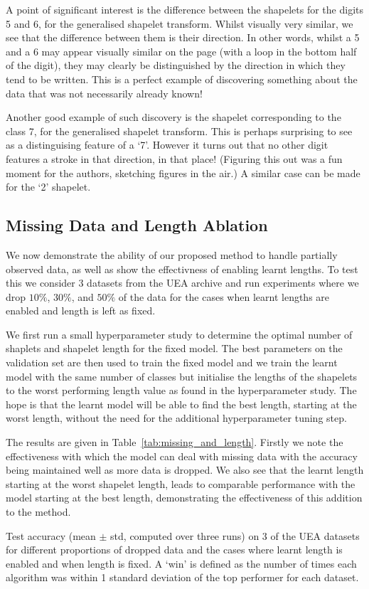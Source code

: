 \documentclass{article}
\theoremstyle{plain}
\theoremstyle{definition}
\begin{document}
A point of significant interest is the difference between the shapelets for the digits 5 and 6, for the generalised shapelet transform. Whilst visually very similar, we see that the difference between them is their direction. In other words, whilst a 5 and a 6 may appear visually similar on the page (with a loop in the bottom half of the digit), they may clearly be distinguished by the direction in which they tend to be written. This is a perfect example of discovering something about the data that was not necessarily already known!

Another good example of such discovery is the shapelet corresponding to the class 7, for the generalised shapelet transform. This is perhaps surprising to see as a distinguising feature of a `7'. However it turns out that no other digit features a stroke in that direction, in that place! (Figuring this out was a fun moment for the authors, sketching figures in the air.) A similar case can be made for the `2' shapelet.

\subsection{Missing Data and Length Ablation} \label{subsec:uea_missing_and_length}
	We now demonstrate the ability of our proposed method to handle partially observed data, as well as show the effectivness of enabling learnt lengths. To test this we consider 3 datasets from the UEA archive and run experiments where we drop $10\%$, $30\%$, and $50\%$ of the data for the cases when learnt lengths are enabled and length is left as fixed.

	We first run a small hyperparameter study to determine the optimal number of shaplets and shapelet length for the fixed model. The best parameters on the validation set are then used to train the fixed model and we train the learnt model with the same number of classes but initialise the lengths of the shapelets to the worst performing length value as found in the hyperparameter study. The hope is that the learnt model will be able to find the best length, starting at the worst length, without the need for the additional hyperparameter tuning step.

	 The results are given in Table~\ref{tab:missing_and_length}. Firstly we note the effectiveness with which the model can deal with missing data with the accuracy being maintained well as more data is dropped. We also see that the learnt length starting at the worst shapelet length, leads to comparable performance with the model starting at the best length, demonstrating the effectiveness of this addition to the method.
\begin{table}[ht]
    \label{tab:missing_and_length}
    \centering
    
	\caption{Test accuracy (mean $\pm$ std, computed over three runs) on 3 of the UEA datasets for different proportions of dropped data and the cases where learnt length is enabled and when length is fixed. A `win' is defined as the number of times each algorithm was within 1 standard deviation of the top performer for each dataset.}
\end{table}
\end{document}
